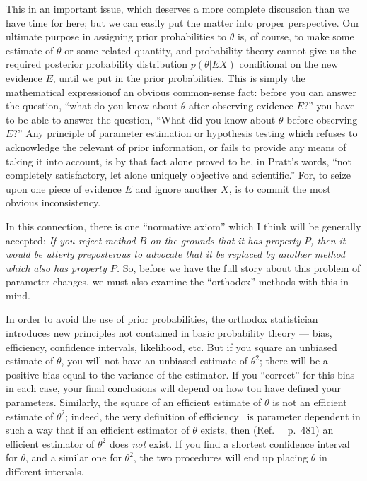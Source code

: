 \documentclass[12pt]{article}
\let\oldcite\cite
\renewcommand{\cite}{~\oldcite}
\begin{document}
This in an important issue, which deserves a more complete discussion
than we have time for here; but we can easily put the matter into proper
perspective. Our ultimate purpose in assigning prior probabilities
to $\theta$ is, of course, to make some estimate of $\theta$ or some related
quantity, and probability theory cannot give us the required posterior
probability distribution $p(\theta|EX)$ conditional on the new evidence $E$,
until we put in the prior probabilities. This is simply the mathematical expressionof an obvious common-sense fact: before you can answer the
question, ``what do you know about $\theta$ after observing evidence $E$?'' you
have to be able to answer the question, ``What did you know about $\theta$ before observing $E$?'' Any principle of parameter estimation or
hypothesis testing which refuses to acknowledge the relevant of prior information, or fails to provide any means of taking it into
account, is by that fact alone proved to be, in Pratt's words, ``not
completely satisfactory, let alone uniquely objective and scientific.''
For, to seize upon one piece of evidence $E$ and ignore another $X$, is
to commit the most obvious inconsistency.

In this connection, there is one ``normative axiom'' which I think will be generally accepted: \emph{If you reject method $B$ on the grounds that it has property $P$, then it would be utterly preposterous to advocate that it be replaced by another method which also has property $P$.} So,  before we have the full story about this problem of parameter changes, we must also examine the ``orthodox'' methods with this in mind.

In order to avoid the use of prior probabilities, the orthodox statistician introduces new principles not contained in basic probability theory --- bias, efficiency, confidence intervals, likelihood, etc. But if you square an unbiased estimate of $\theta$, you will not have an unbiased estimate of $\theta^2$; there will be a positive bias equal to the variance of the estimator. If you ``correct'' for this bias in each case, your final conclusions will depend on how tou have defined your parameters.
Similarly, the square of an efficient estimate of $\theta$ is not an efficient estimate of $\theta^2$; indeed, the very definition of efficiency\cite{cramer} is parameter dependent in such a way that if an efficient estimator of $\theta$ exists, then (Ref.~\cite{cramer} p.~481) an efficient estimator of $\theta^2$ does \emph{not} exist.
 If you find a shortest confidence interval for $\theta$, and
a similar one for $\theta^2$, the two procedures will end up placing $\theta$ in
different intervals.
\end{document}
